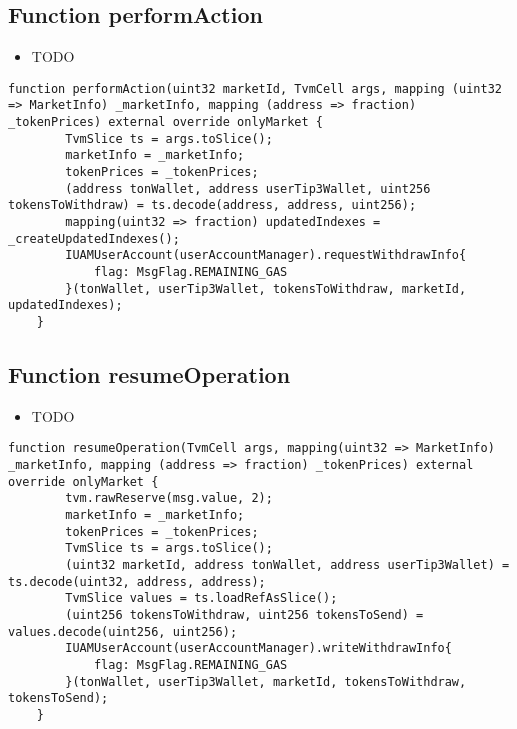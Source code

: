 \subsection{Function performAction}

\noindent\begin{itemize}
\item TODO
\end{itemize}

\begin{lstlisting}[firstnumber=89]
    function performAction(uint32 marketId, TvmCell args, mapping (uint32 => MarketInfo) _marketInfo, mapping (address => fraction) _tokenPrices) external override onlyMarket {
        TvmSlice ts = args.toSlice();
        marketInfo = _marketInfo;
        tokenPrices = _tokenPrices;
        (address tonWallet, address userTip3Wallet, uint256 tokensToWithdraw) = ts.decode(address, address, uint256);
        mapping(uint32 => fraction) updatedIndexes = _createUpdatedIndexes();
        IUAMUserAccount(userAccountManager).requestWithdrawInfo{
            flag: MsgFlag.REMAINING_GAS
        }(tonWallet, userTip3Wallet, tokensToWithdraw, marketId, updatedIndexes);
    }
\end{lstlisting}

\subsection{Function resumeOperation}

\noindent\begin{itemize}
\item TODO
\end{itemize}

\begin{lstlisting}[firstnumber=177]
    function resumeOperation(TvmCell args, mapping(uint32 => MarketInfo) _marketInfo, mapping (address => fraction) _tokenPrices) external override onlyMarket {
        tvm.rawReserve(msg.value, 2);
        marketInfo = _marketInfo;
        tokenPrices = _tokenPrices;
        TvmSlice ts = args.toSlice();
        (uint32 marketId, address tonWallet, address userTip3Wallet) = ts.decode(uint32, address, address);
        TvmSlice values = ts.loadRefAsSlice();
        (uint256 tokensToWithdraw, uint256 tokensToSend) = values.decode(uint256, uint256);
        IUAMUserAccount(userAccountManager).writeWithdrawInfo{
            flag: MsgFlag.REMAINING_GAS
        }(tonWallet, userTip3Wallet, marketId, tokensToWithdraw, tokensToSend);
    }
\end{lstlisting}

